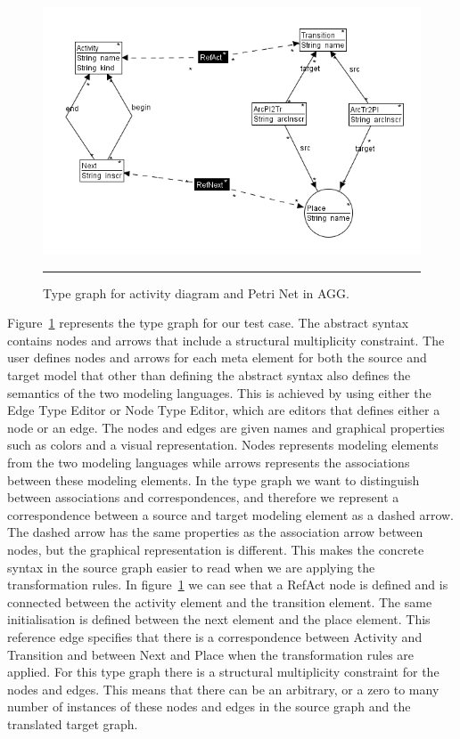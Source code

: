 \begin{figure}[H]
	\centering
	\includegraphics[scale=0.7]{figures/AggTypeGraph.png}
	\rule{35em}{0.5pt}
	\caption[Type graph in AGG]
	{Type graph for activity diagram and Petri Net in AGG.}
	\label{fig:AggTypeGraph}
\end{figure}

Figure~\ref{fig:AggTypeGraph} represents the type graph for our test case. The
abstract syntax contains nodes and arrows that include a structural multiplicity
constraint. The user defines nodes and arrows for each meta element for both
the source and target model that other than defining the abstract syntax
also defines the semantics of the two modeling languages. This is achieved by
using either the Edge Type Editor or Node Type Editor, which are editors that
defines either a node or an edge. The nodes and edges are given names and
graphical properties such as colors and a visual representation. Nodes
represents modeling elements from the two modeling languages while arrows
represents the associations between these modeling elements. In the type graph
we want to distinguish between associations and correspondences, and therefore
we represent a correspondence between a source and target modeling element as a
dashed arrow. The dashed arrow has the same properties as the association arrow
between nodes, but the graphical representation is different. This makes the
concrete syntax in the source graph easier to read when we are applying the
transformation rules. In figure~\ref{fig:AggTypeGraph} we can see that a RefAct
node is defined and is connected between the activity element and the
transition element. The same initialisation is defined between the next element
and the place element. This reference edge specifies that there is a
correspondence between Activity and Transition and between Next and
Place when the transformation rules are applied. For this type graph there is a
structural multiplicity constraint for the nodes and edges. This means that
there can be an arbitrary, or a zero to many number of instances of these nodes
and edges in the source graph and the translated target graph. 

